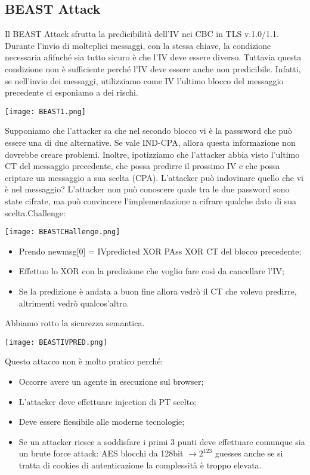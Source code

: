 \documentclass{article}
\theoremstyle{remark}
\begin{document}
\subsection{BEAST Attack}
Il BEAST Attack sfrutta la predicibilità dell'IV nei CBC in TLS v.1.0/1.1. Durante l'invio di molteplici messaggi, con la stessa chiave, la condizione necessaria afifnché sia tutto sicuro è che l'IV deve essere diverso. Tuttavia questa condizione non è sufficiente perché l'IV deve essere anche non predicibile.
Infatti, se nell'invio dei messaggi, utilizziamo come IV l'ultimo blocco del messaggio precedente ci esponiamo a dei rischi.
\begin{center}
	\texttt{[image: BEAST1.png]}
\end{center}
Supponiamo che l'attacker sa che nel secondo blocco vi è la passsword che può essere una di due alternative. Se vale IND-CPA, allora questa informazione non dovrebbe creare problemi. Inoltre, ipotizziamo che l'attacker abbia visto l'ultimo CT del messaggio precedente, che possa predirre il prossimo IV e che possa criptare un messaggio a sua scelta (CPA). L'attacker può indovinare quello che vi è nel messaggio?\newline
L'attacker non può conoscere quale tra le due password sono state cifrate, ma può convincere l'implementazione a cifrare qualche dato di sua scelta.Challenge:\begin{center}
	\texttt{[image: BEASTCHallenge.png]}
\end{center}
\begin{itemize}
	\item Prendo newmsg[0] = IVpredicted XOR PAss XOR CT del blocco precedente;
	\item Effettuo lo XOR con la predizione che voglio fare così da cancellare l'IV;
	\item Se la predizione è andata a buon fine allora vedrò il CT che volevo predirre, altrimenti vedrò qualcos'altro.
\end{itemize}
Abbiamo rotto la sicurezza semantica.\begin{center}
	\texttt{[image: BEASTIVPRED.png]}
\end{center}
Questo attacco non è molto pratico perché:\begin{itemize}
	\item Occorre avere un agente in esecuzione sul browser;
	\item L'attacker deve effettuare injection di PT scelto;
	\item Deve essere flessibile alle moderne tecnologie;
	\item Se un attacker riesce a soddisfare i primi  3 punti deve effettuare comunque sia un brute force attack: AES blocchi da 128bit $\rightarrow 2^{123}$ guesses anche se si tratta di cookies di autenticazione la complessità è troppo elevata.
\end{itemize}
\end{document}

